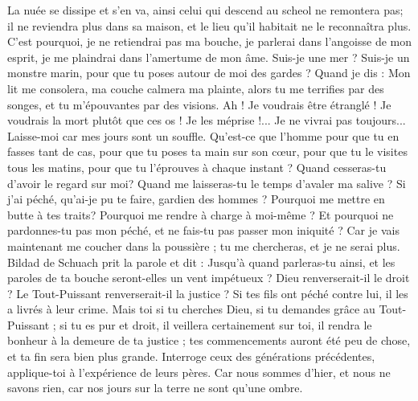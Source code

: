 \begin{multicols}{2}
La nuée se dissipe et s'en va, ainsi celui qui descend au scheol ne remontera pas;
il ne reviendra plus dans sa maison, et le lieu qu'il habitait  ne le reconnaîtra plus.
C'est pourquoi, je ne retiendrai pas ma bouche, je parlerai dans l'angoisse de mon esprit, je me plaindrai dans l'amertume de mon âme.
Suis-je une mer ? Suis-je un monstre marin, pour que tu poses autour de moi des gardes ?
Quand je dis : Mon lit me consolera, ma couche calmera ma plainte,
alors tu me terrifies par des songes, et tu m'épouvantes par des visions.
Ah ! Je voudrais être étranglé ! Je voudrais la mort plutôt que ces os !
Je les méprise !... Je ne vivrai pas toujours... Laisse-moi car mes jours sont un souffle.
Qu'est-ce que l'homme pour que tu en fasses tant de cas, pour que tu poses ta main sur son cœur,
pour que tu le visites tous les matins, pour que tu l'éprouves à chaque instant ?
Quand cesseras-tu d'avoir le regard sur moi? Quand me laisseras-tu le temps d'avaler ma salive ?
Si j'ai péché, qu'ai-je pu te faire, gardien des hommes ? Pourquoi me mettre en butte à tes traits? Pourquoi me rendre à charge à moi-même ?
Et pourquoi ne pardonnes-tu pas mon péché, et ne fais-tu pas passer mon iniquité ? Car je vais maintenant me coucher dans la poussière ; tu me chercheras, et je ne serai plus.
\VerseOne{}Bildad de Schuach prit la parole et dit :
Jusqu'à quand parleras-tu ainsi, et les paroles de ta bouche seront-elles un vent impétueux ?
Dieu renverserait-il le droit ? Le Tout-Puissant renverserait-il la justice ?
Si tes fils ont péché contre lui, il les a livrés à leur crime.
Mais toi si tu cherches Dieu, si tu demandes grâce au Tout-Puissant ;
si tu es pur et droit, il veillera certainement sur toi, il rendra le bonheur à la demeure de ta justice ;
tes commencements auront été peu de chose, et ta fin sera bien plus grande.
Interroge ceux des générations précédentes, applique-toi à l'expérience de leurs pères.
Car nous sommes d'hier, et nous ne savons rien, car nos jours sur la terre ne sont qu'une ombre.

\end{multicols}
